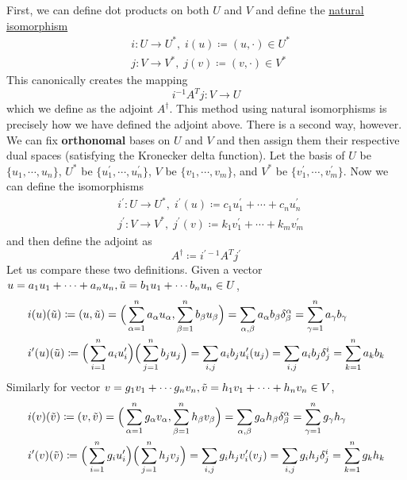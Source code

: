   First, we can define dot products on both $U$ and $V$ and define the \hyperref[cat-def:natural-isomorphism]{natural isomorphism} 
  \begin{align*}
    &i: U \to U^\ast, \; i(u) \coloneqq (u, \cdot) \in U^\ast\\
    &j: V \to V^\ast, \; j(v) \coloneqq (v, \cdot) \in V^\ast
  \end{align*}
  This canonically creates the mapping 
  \begin{equation}
    i^{-1} A^T j: V \to U
  \end{equation}
  which we define as the adjoint $A^\dagger$. This method using natural isomorphisms is precisely how we have defined the adjoint above. There is a second way, however. We can fix \textbf{orthonomal} bases on $U$ and $V$ and then assign them their respective dual spaces (satisfying the Kronecker delta function). Let the basis of $U$ be $\{u_1, \cdots, u_n\}$, $U^\ast$ be $\{u_1^\prime, \cdots, u_n^\prime\}$, $V$ be $\{v_1, \cdots, v_m\}$, and $V^\ast$ be $\{v_1^\prime, \cdots, v_m^\prime\}$. Now we can define the isomorphisms 
  \begin{align*}
    & i^\prime: U \to U^\ast, \; i^\prime (u) \coloneqq c_1 u_1^\prime + \cdots + c_n u_n^\prime \\
    & j^\prime: V \to V^\ast, \; j^\prime (v) \coloneqq k_1 v_1^\prime + \cdots + k_m v_m^\prime
  \end{align*}
  and then define the adjoint as 
  \begin{equation}
    A^\dagger \coloneqq i^{\prime -1} A^T j^\prime
  \end{equation}
  Let us compare these two definitions. Given a vector $u = a_1 u_1 + \cdots + a_n u_n, \Tilde{u} = b_1 u_1 + \cdots b_n u_n \in U$, 
  \begin{align*}
    &i(u)(\Tilde{u}) \coloneqq (u, \Tilde{u}) = \Big(\sum_{\alpha = 1}^n a_\alpha u_\alpha, \sum_{\beta = 1}^n b_\beta u_\beta \Big) = \sum_{\alpha, \beta} a_\alpha b_\beta \delta^\alpha_\beta = \sum_{\gamma=1}^n a_\gamma b_\gamma \\
    &i^\prime(u)(\Tilde{u}) \coloneqq \Big(\sum_{i=1}^n a_i u_i^\prime \Big) \Big( \sum_{j=1}^n b_j u_j \Big) = \sum_{i, j} a_i b_j u_i^\prime (u_j) = \sum_{i, j} a_i b_j \delta^i_j = \sum_{k=1}^n a_k b_k
  \end{align*}
  Similarly for vector $v = g_1 v_1 + \cdots g_n v_n, \Tilde{v} = h_1 v_1 + \cdots + h_n v_n \in V$, 
  \begin{align*}
    &i(v)(\Tilde{v}) \coloneqq (v, \Tilde{v}) = \Big(\sum_{\alpha = 1}^n g_\alpha v_\alpha, \sum_{\beta = 1}^n h_\beta v_\beta \Big) = \sum_{\alpha, \beta} g_\alpha h_\beta \delta^\alpha_\beta = \sum_{\gamma=1}^n g_\gamma h_\gamma \\
    &i^\prime(v)(\Tilde{v}) \coloneqq \Big(\sum_{i=1}^n g_i u_i^\prime \Big) \Big( \sum_{j=1}^n h_j v_j \Big) = \sum_{i, j} g_i h_j v_i^\prime (v_j) = \sum_{i, j} g_i h_j \delta^i_j = \sum_{k=1}^n g_k h_k
  \end{align*}
